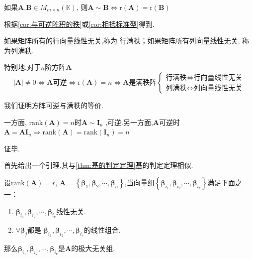 \begin{green}
    \begin{corollary}[相抵与秩]\label{cor:相抵与秩}
    如果$\bm{A}$,$\bm{B}\in M_{
        m \times n
    }\left(\mathbb{K}\right)$,
    则$\bm{A} \sim \bm{B} \Longleftrightarrow 
    \mathrm{r}\left(\bm{A}\right)
    = \mathrm{r}\left(\bm{B}
    \right)$
\end{corollary}
\begin{Proof}
根据\cref{cor:与可逆阵积的秩}或\cref{cor:相抵标准型}得到.
\end{Proof}
\end{green}
\begin{formal}
    \begin{definition}[满秩]\label{def:满秩}
    如果矩阵所有的行向量线性无关,称为
    行满秩；如果矩阵所有列向量线性无关,
    称为列满秩.
\end{definition}
\end{formal}
\begin{formal}
\begin{theorem}[矩阵可逆与满秩]\label{thm:矩阵可逆与满秩}
特别地,对于$n$阶方阵$\bm{A}$
\[
\left|\bm{A}\right| \neq 0
\Longleftrightarrow 
\bm{A}\text{可逆}\Longleftrightarrow 
\mathrm{r}\left(\bm{A}\right)
= n\Longleftrightarrow 
\bm{A}\text{是满秩阵}\begin{cases*}
    \text{行满秩}\Longleftrightarrow
    \text{行向量线性无关} \\
    \text{列满秩}\Longleftrightarrow
    \text{列向量线性无关} 
\end{cases*}
\]
\end{theorem}
\begin{Proof}
我们证明方阵可逆与满秩的等价.

一方面,
$\mathrm{rank}\left(\bm{A}\right)=n$时$\bm{A}\sim \bm{I}_n$
,可逆.另一方面,$\bm{A}$可逆时
$\bm{A}=\bm{AI}_n\Longrightarrow
\mathrm{rank}\left(\bm{A}\right)=\mathrm{rank}\left(\bm{I}_n\right)
=n$

证毕.
\end{Proof}
\end{formal}
首先给出一个引理,其与\cref{thm:基的判定定理}基的判定定理相似.
\begin{green}
\begin{lemma}[极大无关组的判定定理]\label{lem:极大无关组的判定定理}
        设$\mathrm{rank}\left(\bm{A}\right)=r$,
    $\bm{A}=\left\{\bm{\beta}_1,\bm{\beta}_2,\cdots,
    \bm{\beta}_n\right\}$,当向量组$\left\{
    \bm{\beta}_{i_1},\bm{\beta}_{i_2},\cdots,
    \bm{\beta}_{i_r}\right\}$满足下面之一：
    \begin{enumerate}[label=\textup{(\arabic*)}]
    \item $\bm{\beta}_{i_1},\bm{\beta}_{i_2},\cdots,
    \bm{\beta}_{i_r}$线性无关.
    \item $\forall \bm{\beta}_j$都是
    $\bm{\beta}_{i_1},\bm{\beta}_{i_2},\cdots,
    \bm{\beta}_{i_r}$的线性组合.
    \end{enumerate}
    那么$\bm{\beta}_{i_1},\bm{\beta}_{i_2},\cdots,
    \bm{\beta}_{i_r}$是$\bm{A}$的极大无关组.
\end{lemma}
\end{green}
